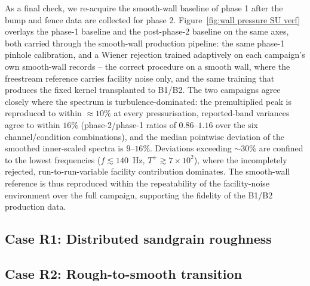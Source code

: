 As a final check, we re-acquire the smooth-wall baseline of phase 1 after the bump and fence data are collected for phase 2. Figure~\ref{fig:wall pressure SU verf} overlays the phase-1 baseline and the post-phase-2 baseline on the same axes, both carried through the smooth-wall production pipeline: the same phase-1 pinhole calibration, and a Wiener rejection trained adaptively on each campaign's own smooth-wall records -- the correct procedure on a smooth wall, where the freestream reference carries facility noise only, and the same training that produces the fixed kernel transplanted to B1/B2. The two campaigns agree closely where the spectrum is turbulence-dominated: the premultiplied peak is reproduced to within ${\approx}10\%$ at every pressurisation, reported-band variances agree to within $16\%$ (phase-2/phase-1 ratios of $0.86$--$1.16$ over the six channel/condition combinations), and the median pointwise deviation of the smoothed inner-scaled spectra is $9$--$16\%$. Deviations exceeding ${\sim}30\%$ are confined to the lowest frequencies ($f \lesssim 140$~Hz, $T^{+} \gtrsim 7\times10^{2}$), where the incompletely rejected, run-to-run-variable facility contribution dominates. The smooth-wall reference is thus reproduced within the repeatability of the facility-noise environment over the full campaign, supporting the fidelity of the B1/B2 production data.

\vspace{2in}

\subsection{Case R1: Distributed sandgrain roughness}

\subsection{Case R2: Rough-to-smooth transition}
